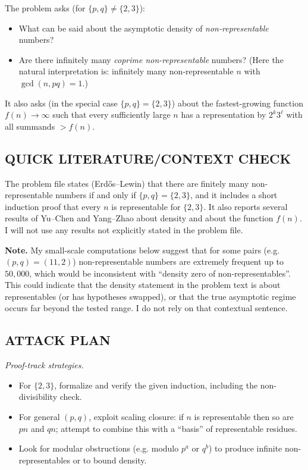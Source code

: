 The problem asks (for $\{p,q\}\ne\{2,3\}$):
\begin{itemize}
\item What can be said about the asymptotic density of \emph{non-representable} numbers?
\item Are there infinitely many \emph{coprime non-representable} numbers?
(Here the natural interpretation is: infinitely many non-representable $n$ with $\gcd(n,pq)=1$.)
\end{itemize}

It also asks (in the special case $\{p,q\}=\{2,3\}$) about the fastest-growing function $f(n)\to\infty$ such that every sufficiently large $n$ has a representation by $2^k3^\ell$ with all summands $>f(n)$.

\subsection*{QUICK LITERATURE/CONTEXT CHECK}
The problem file states (Erd\H{o}s--Lewin) that there are finitely many non-representable numbers if and only if $\{p,q\}=\{2,3\}$, and it includes a short induction proof that every $n$ is representable for $\{2,3\}$.
It also reports several results of Yu--Chen and Yang--Zhao about density and about the function $f(n)$.
I will not use any results not explicitly stated in the problem file.

\textbf{Note.} My small-scale computations below suggest that for some pairs (e.g. $(p,q)=(11,2)$) non-representable numbers are extremely frequent up to $50{,}000$, which would be inconsistent with ``density zero of non-representables''. This could indicate that the density statement in the problem text is about representables (or has hypotheses swapped), or that the true asymptotic regime occurs far beyond the tested range. I do not rely on that contextual sentence.

\subsection*{ATTACK PLAN}
\emph{Proof-track strategies.}
\begin{itemize}
\item For $\{2,3\}$, formalize and verify the given induction, including the non-divisibility check.
\item For general $(p,q)$, exploit scaling closure: if $n$ is representable then so are $pn$ and $qn$; attempt to combine this with a ``basis'' of representable residues.
\item Look for modular obstructions (e.g. modulo $p^a$ or $q^b$) to produce infinite non-representables or to bound density.
\end{itemize}

